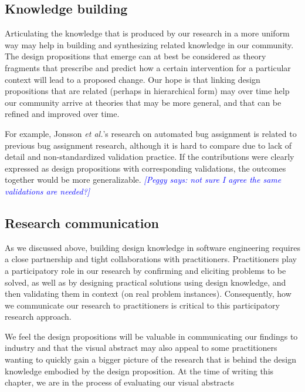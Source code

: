\documentclass[graybox]{svmult}
\newcommand{\peggy}[1]{\textcolor{blue}{{\it [Peggy says: #1]}}}
\newcommand{\peggy}[1]{}
\begin{document}
\subsection{Knowledge building}
\label{sec:knowledge}

Articulating the knowledge that is produced by our research in a more uniform way may help in building and synthesizing related knowledge in our community. 
The design propositions that emerge can at best be considered as theory fragments that prescribe and predict how a certain intervention for a particular context will lead to a proposed change. 
Our hope is that linking design propositions that are related (perhaps in hierarchical form) may over time help our community arrive at theories that may be more general, and that can be refined and improved over time. 

For example, Jonsson \emph{et al.}'s research on automated bug assignment is related to previous bug assignment research, although it is hard to compare due to lack of detail and non-standardized validation practice. If the contributions were clearly expressed as design propositions with corresponding validations, the outcomes together would be more generalizable. 
\peggy{not sure I agree the same validations are needed?}

\subsection{Research communication}
\label{sec:communication}

As we discussed above, building design knowledge in software engineering requires a close partnership and tight collaborations with practitioners. 
Practitioners play a participatory role in our research by confirming and eliciting problems to be solved, as well as by designing practical solutions using design knowledge, and then validating them in context (on real problem instances). 
Consequently, how we communicate our research to practitioners is critical to this participatory research approach. 

We feel the design propositions will be valuable in communicating our findings to industry and that the visual abstract may also appeal to some practitioners wanting to quickly gain a bigger picture of the research that is behind the design knowledge embodied by the design proposition. 
At the time of writing this chapter, we are in the process of evaluating our visual abstracts
\end{document}
